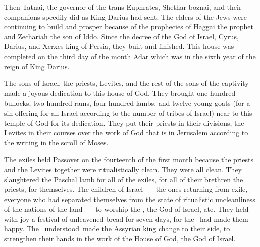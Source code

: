 \begin{inparaenum}\setcounter{enumi}{12}
   Then Tatnai, the governor of the trans-Euphrates, Shethar-boznai, and their companions speedily did as King Darius had sent.%
   The elders of the Jews were continuing to build and prosper because of the prophecies of Haggai the prophet and Zechariah the son of Iddo. Since the decree of the God of Israel, Cyrus, Darius, and Xerxes king of Persia, they built and finished.%
   This house was completed on the third day of the month Adar which was in the sixth year of the reign of King Darius.%

   The sons of Israel, the priests, Levites, and the rest of the sons of the captivity made a joyous dedication to this house of God.%
   They brought one hundred bullocks, two hundred rams, four hundred lambs, and twelve young goats (for a sin offering for all Israel according to the number of tribes of Israel) near to this temple of God for its dedication.%
   They put their priests in their divisions, the Levites in their courses over the work of God that is in Jerusalem according to the writing in the scroll of Moses.%

   The exiles held Passover on the fourteenth of the first month%
   because the priests and the Levites together were ritualistically clean. They were all clean. They slaughtered the Paschal lamb for all of the exiles, for all of their brethren the priests, for themselves.%
   The children of Israel~--- the ones returning from exile, everyone who had separated themselves from the state of ritualistic uncleanliness of the nations of the land~--- to worship the \lord, the God of Israel, ate.%
   They held with joy a festival of unleavened bread for seven days, for the \lord\ had made them happy. The \lord\ understood\ made the Assyrian king change to their side, to strengthen their hands in the work of the House of God, the God of Israel.%
\end{inparaenum}
